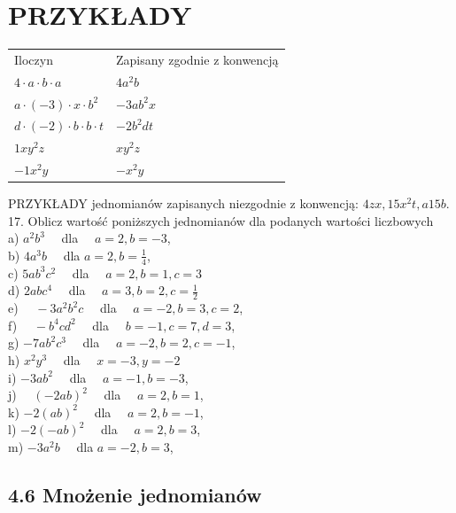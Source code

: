 \documentclass[10pt]{article}
\begin{document}
\section*{PRZYKŁADY}
\begin{center}
\begin{tabular}{ll}
Iloczyn & Zapisany zgodnie z konwencją \\
\(4 \cdot a \cdot b \cdot a\) & \(4 a^{2} b\) \\
\(a \cdot(-3) \cdot x \cdot b^{2}\) & \(-3 a b^{2} x\) \\
\(d \cdot(-2) \cdot b \cdot b \cdot t\) & \(-2 b^{2} d t\) \\
\(1 x y^{2} z\) & \(x y^{2} z\) \\
\(-1 x^{2} y\) & \(-x^{2} y\) \\
\end{tabular}
\end{center}

PRZYKŁADY jednomianów zapisanych niezgodnie z konwencją: \(4 z x, 15 x^{2} t, a 15 b\).\\
17. Oblicz wartość poniższych jednomianów dla podanych wartości liczbowych\\
a) \(a^{2} b^{3} \quad\) dla \(\quad a=2, b=-3\),\\
b) \(4 a^{3} b \quad\) dla \(a=2, b=\frac{1}{4}\),\\
c) \(5 a b^{3} c^{2} \quad\) dla \(\quad a=2, b=1, c=3\)\\
d) \(2 a b c^{4} \quad\) dla \(\quad a=3, b=2, c=\frac{1}{2}\)\\
e) \(\quad-3 a^{2} b^{2} c \quad\) dla \(\quad a=-2, b=3, c=2\),\\
f) \(\quad-b^{4} c d^{2} \quad\) dla \(\quad b=-1, c=7, d=3\),\\
g) \(-7 a b^{2} c^{3} \quad\) dla \(\quad a=-2, b=2, c=-1\),\\
h) \(x^{2} y^{3} \quad\) dla \(\quad x=-3, y=-2\)\\
i) \(-3 a b^{2} \quad\) dla \(\quad a=-1, b=-3\),\\
j) \(\quad(-2 a b)^{2} \quad\) dla \(\quad a=2, b=1\),\\
k) \(-2(a b)^{2} \quad\) dla \(\quad a=2, b=-1\),\\
l) \(-2(-a b)^{2} \quad\) dla \(\quad a=2, b=3\),\\
m) \(-3 a^{2} b \quad\) dla \(a=-2, b=3\),

\subsection*{4.6 Mnożenie jednomianów}
\end{document}
